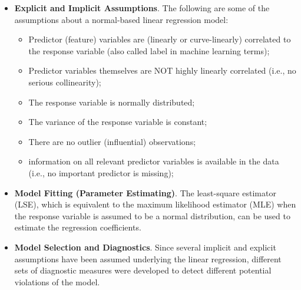 \documentclass[
]{book}
\providecommand{\tightlist}{%
  \setlength{\itemsep}{0pt}\setlength{\parskip}{0pt}}
\begin{document}
\begin{itemize}
\item
  \textbf{Explicit and Implicit Assumptions}. The following are some of the assumptions about a normal-based linear regression model:

  \begin{itemize}
  \tightlist
  \item
    Predictor (feature) variables are (linearly or curve-linearly) correlated to the response variable (also called label in machine learning terms);
  \item
    Predictor variables themselves are NOT highly linearly correlated (i.e., no serious collinearity);
  \item
    The response variable is normally distributed;
  \item
    The variance of the response variable is constant;
  \item
    There are no outlier (influential) observations;
  \item
    information on all relevant predictor variables is available in the data (i.e., no important predictor is missing);
  \end{itemize}
\item
  \textbf{Model Fitting (Parameter Estimating)}. The least-square estimator (LSE), which is equivalent to the maximum likelihood estimator (MLE) when the response variable is assumed to be a normal distribution, can be used to estimate the regression coefficients.
\item
  \textbf{Model Selection and Diagnostics}. Since several implicit and explicit assumptions have been assumed underlying the linear regression, different sets of diagnostic measures were developed to detect different potential violations of the model.


\end{itemize}
\end{document}
